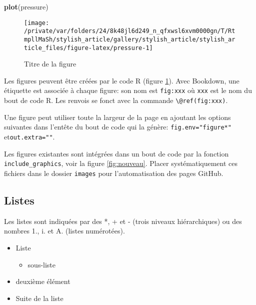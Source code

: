 \documentclass[fleqn,10pt]{latex/stylish_article} %
\providecommand{\tightlist}{%
  \setlength{\itemsep}{0pt}\setlength{\parskip}{0pt}}
\newenvironment{Shaded}{\begin{snugshade}}{\end{snugshade}}
\newcommand{\KeywordTok}[1]{\textcolor[rgb]{0.13,0.29,0.53}{\textbf{{#1}}}}
\newcommand{\NormalTok}[1]{{#1}}
\begin{document}
\scriptsize

\begin{Shaded}
\begin{Highlighting}[]
\KeywordTok{plot}\NormalTok{(pressure)}
\end{Highlighting}
\end{Shaded}

\begin{figure}

{\centering \texttt{[image: /private/var/folders/24/8k48jl6d249\_n\_qfxwsl6xvm0000gn/T/RtmpllMaSh/stylish\_article/gallery/stylish\_article/stylish\_article\_files/figure-latex/pressure-1]} 

}

\caption{Titre de la figure}\label{fig:pressure}
\end{figure}

\normalsize

Les figures peuvent être créées par le code R (figure \ref{fig:pressure}).
Avec Bookdown, une étiquette est associée à chaque figure: son nom est \texttt{fig:xxx} où \texttt{xxx} est le nom du bout de code R.
Les renvois se fonct avec la commande \texttt{\textbackslash{}@ref(fig:xxx)}.

Une figure peut utiliser toute la largeur de la page en ajoutant les options suivantes dans l'entête du bout de code qui la génère: \texttt{fig.env="figure*"} et\break \texttt{out.extra=""}.

Les figures existantes sont intégrées dans un bout de code par la fonction \texttt{include\_graphics}, voir la figure \ref{fig:nouveau}.
Placer systématiquement ces fichiers dans le dossier \texttt{images} pour l'automatisation des pages GitHub.

\hypertarget{listes}{%
\subsection{Listes}\label{listes}}

Les listes sont indiquées par des *, + et - (trois niveaux hiérarchiques) ou des nombres 1., i. et A. (listes numérotées).

\begin{itemize}
\tightlist
\item
  Liste

  \begin{itemize}
  \tightlist
  \item
    sous-liste
  \end{itemize}
\item
  deuxième élément
\item
  Suite de la liste
\end{itemize}
\end{document}
